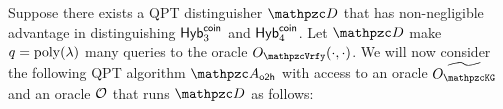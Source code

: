 %

Suppose there exists a QPT distinguisher $\qD$ that has
non-negligible advantage in distinguishing $\mathsf{Hyb}_3^{\mathsf{coin}}$ and
$\mathsf{Hyb}_4^{\mathsf{coin}}$. Let $\qD$ make $q = {\mathrm{poly}}(\lambda)$ many queries to
the oracle $\Oracle{\qVrfy}(\cdot, \cdot)$. We will now consider the
following QPT algorithm $\qA_\oh$ with access to an oracle
$\widetilde{\Oracle{\qKG}}$ and an oracle $\mathcal{O}$ that runs $\qD$ as follows:

